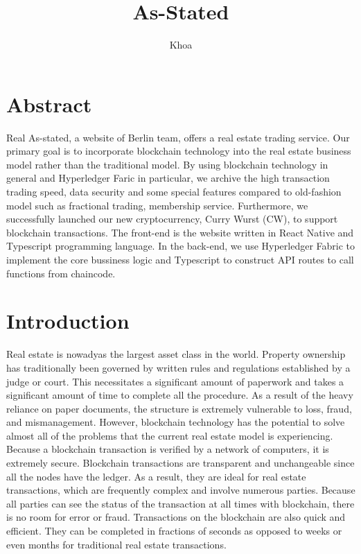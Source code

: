 \documentclass[11pt]{article}
\title{\LARGE As-Stated}
\author{Khoa}
\begin{document}
    \maketitle
    \begin{multicols}{2}
        \section{Abstract} 
            Real As-stated, a website of Berlin team, offers a real estate trading service.
            Our primary goal is to incorporate blockchain technology into the real estate business model rather than the traditional model.
            By using blockchain technology in general and Hyperledger Faric in particular, we archive the high transaction trading speed, data security and some special features compared to old-fashion model such as fractional trading, membership service.
            Furthermore, we successfully launched our new cryptocurrency, Curry Wurst (CW), to support blockchain transactions.
            The front-end is the website written in React Native and Typescript programming language.
            In the back-end, we use Hyperledger Fabric to implement the core bussiness logic and Typescript to construct API routes to call functions from chaincode.
        \section{Introduction}
        Real estate is nowadyas the largest asset class in the world. 
        Property ownership has traditionally been governed by written rules and regulations established by a judge or court.
        This necessitates a significant amount of paperwork and takes a significant amount of time to complete all the procedure.
        As a result of the heavy reliance on paper documents, the structure is extremely vulnerable to loss, fraud, and mismanagement.
        However, blockchain technology has the potential to solve almost all of the problems that the current real estate model is experiencing. \\
        Because a blockchain transaction is verified by a network of computers, it is extremely secure. 
        Blockchain transactions are transparent and unchangeable since all the nodes have the ledger. 
        As a result, they are ideal for real estate transactions, which are frequently complex and involve numerous parties. 
        Because all parties can see the status of the transaction at all times with blockchain, there is no room for error or fraud. 
        Transactions on the blockchain are also quick and efficient. 
        They can be completed in fractions of seconds as opposed to weeks or even months for traditional real estate transactions.

\end{multicols}
\end{document}
